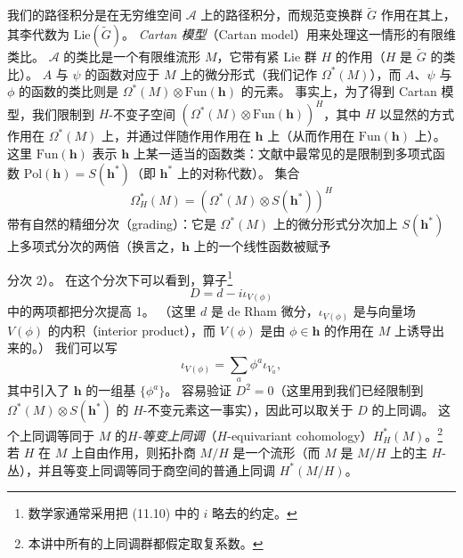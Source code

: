 我们的路径积分是在无穷维空间 $\mathcal{A}$ 上的路径积分，而规范变换群 $\widetilde G$ 作用在其上，其李代数为 $\mathrm{Lie}(\widetilde G)$。
\emph{Cartan 模型}（Cartan model）用来处理这一情形的有限维类比。
$\mathcal{A}$ 的类比是一个有限维流形 $M$，它带有紧 Lie 群 $H$ 的作用（$H$ 是 $\widetilde G$ 的类比）。
$A$ 与 $\psi$ 的函数对应于 $M$ 上的微分形式（我们记作 $\Omega^{*}(M)$），而 $A$、$\psi$ 与 $\phi$ 的函数的类比则是 $\Omega^{*}(M)\otimes\mathrm{Fun}(\mathbf{h})$ 的元素。
事实上，为了得到 Cartan 模型，我们限制到 $H$-不变子空间 $\left(\Omega^{*}(M)\otimes\mathrm{Fun}(\mathbf{h})\right)^{H}$，其中 $H$ 以显然的方式作用在 $\Omega^{*}(M)$ 上，并通过伴随作用作用在 $\mathbf{h}$ 上（从而作用在 $\mathrm{Fun}(\mathbf{h})$ 上）。
这里 $\mathrm{Fun}(\mathbf{h})$ 表示 $\mathbf{h}$ 上某一适当的函数类：文献中最常见的是限制到多项式函数 $\mathrm{Pol}(\mathbf{h})=S(\mathbf{h}^{*})$（即 $\mathbf{h}^{*}$ 上的对称代数）。
集合
\[
\Omega^{*}_{H}(M)=\left(\Omega^{*}(M)\otimes S(\mathbf{h}^{*})\right)^{H}
\]
带有自然的精细分次（grading）：它是 $\Omega^{*}(M)$ 上的微分形式分次加上 $S(\mathbf{h}^{*})$ 上多项式分次的两倍（换言之，$\mathbf{h}$ 上的一个线性函数被赋予

分次 2）。
在这个分次下可以看到，算子\footnote{数学家通常采用把 (11.10) 中的 $i$ 略去的约定。}
\begin{equation}
  \tag{11.10}
  \label{eq:11-10}
  D=d-i\iota_{V(\phi)}
\end{equation}
中的两项都把分次提高 1。
（这里 $d$ 是 de Rham 微分，$\iota_{V(\phi)}$ 是与向量场 $V(\phi)$ 的内积（interior product），而 $V(\phi)$ 是由 $\phi\in\mathbf{h}$ 的作用在 $M$ 上诱导出来的。）
我们可以写
\[
\iota_{V(\phi)}=\sum_{a}\phi^{a}\iota_{V_{a}},
\]
其中引入了 $\mathbf{h}$ 的一组基 $\{\phi^{a}\}$。
容易验证 $D^{2}=0$（这里用到我们已经限制到 $\Omega^{*}(M)\otimes S(\mathbf{h}^{*})$ 的 $H$-不变元素这一事实），因此可以取关于 $D$ 的上同调。
这个上同调等同于 $M$ 的\emph{$H$-等变上同调}（$H$-equivariant cohomology）$H^{*}_{H}(M)$。\footnote{本讲中所有的上同调群都假定取复系数。}
若 $H$ 在 $M$ 上自由作用，则拓扑商 $M/H$ 是一个流形（而 $M$ 是 $M/H$ 上的主 $H$-丛），并且等变上同调等同于商空间的普通上同调 $H^{*}(M/H)$。


